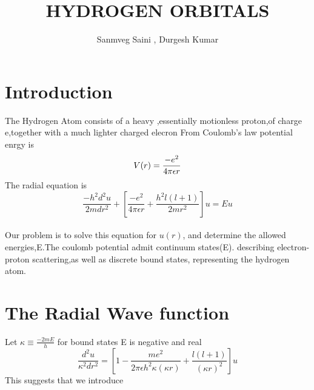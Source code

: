 \documentclass[12pt,a4paper]{report}
\begin{document}
\title{HYDROGEN ORBITALS}
\maketitle
\author{Sanmveg Saini , Durgesh Kumar}



\section{Introduction}
The Hydrogen Atom consists of a heavy ,essentially motionless proton,of charge e,together with a much lighter charged elecron 
From Coulomb's  law potential enrgy is \newline
$$V(r)=\frac{-e^2} {4\pi\epsilon r} \newline$$ 
The radial equation  is 
$$\frac{-h^2 d^2u }{2m dr^2} + \left[\frac{-e^2 }{4\pi\epsilon r} +\frac{{h^2}l(l+1)}{2m r^2}\right]u = Eu $$   \\

Our problem is to solve this equation for $u(r)$, and determine the allowed energies,E.The coulomb potential admit continuum states(E).
describing electron-proton scattering,as well as discrete bound states, representing the hydrogen atom.


\section{The Radial Wave function}

Let
 $ \kappa \equiv  \frac{-2mE}{h}   $  
for bound states E is negative and real \\
$$ \frac{d^2u}{\kappa^2dr^2} = \left[ 1- \frac{me^2}{2\pi\epsilon h^2 \kappa(\kappa r)}+ \frac{l(l+1)}{(\kappa r)^2} \right]u $$ 
This suggests that we introduce \\
\end{document}
